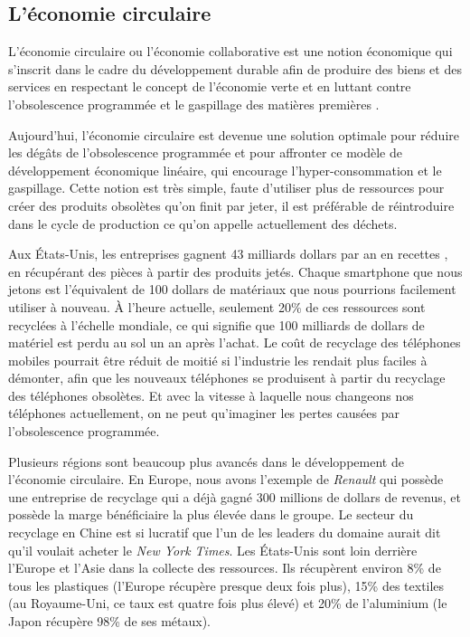 \subsection{L'économie circulaire}


\bigbreak
L’économie circulaire ou l’économie collaborative est une notion économique qui s'inscrit dans le cadre du développement durable afin de produire des biens et des services en respectant le concept de l'économie verte et en luttant contre l'obsolescence programmée et le gaspillage des matières premières \cite{wiki_ec}.


\bigbreak
Aujourd'hui, l'économie circulaire est devenue une solution optimale pour réduire les dégâts de l'obsolescence programmée et pour affronter ce modèle de développement économique linéaire, qui encourage l’hyper-consommation et le gaspillage. Cette notion est très simple, faute d'utiliser plus de ressources pour créer des produits obsolètes qu'on finit par jeter, il est préférable de réintroduire dans le cycle de production ce qu'on appelle actuellement des déchets.


\bigbreak
Aux États-Unis, les entreprises gagnent 43 milliards dollars par an en recettes \cite{usatoday}, en récupérant des pièces à partir des produits jetés. Chaque smartphone que nous jetons est l'équivalent de 100 dollars de matériaux que nous pourrions facilement utiliser à nouveau. À l'heure actuelle, seulement 20\% de ces ressources sont recyclées à l'échelle mondiale, ce qui signifie que 100 milliards de dollars de matériel est perdu au sol un an après l'achat. Le coût de recyclage des téléphones mobiles pourrait être réduit de moitié si l'industrie les rendait plus faciles à démonter, afin que les nouveaux téléphones se produisent à partir du recyclage des téléphones obsolètes. Et avec la vitesse à laquelle nous changeons nos téléphones actuellement, on ne peut qu'imaginer les pertes causées par l'obsolescence programmée.


\bigbreak
Plusieurs régions sont beaucoup plus avancés dans le développement de l'économie circulaire. En Europe, nous avons l'exemple de \textit{Renault} qui possède une entreprise de recyclage qui a déjà gagné 300 millions de dollars de revenus, et possède la marge bénéficiaire la plus élevée dans le groupe. Le secteur du recyclage en Chine est si lucratif que l'un de les leaders du domaine aurait dit qu'il voulait acheter le \textit{New York Times}. Les États-Unis sont loin derrière l'Europe et l'Asie dans la collecte des ressources. Ils récupèrent environ 8\% de tous les plastiques (l'Europe récupère presque deux fois plus), 15\% des textiles (au Royaume-Uni, ce taux est quatre fois plus élevé) et 20\% de l'aluminium (le Japon récupère 98\% de ses métaux).

